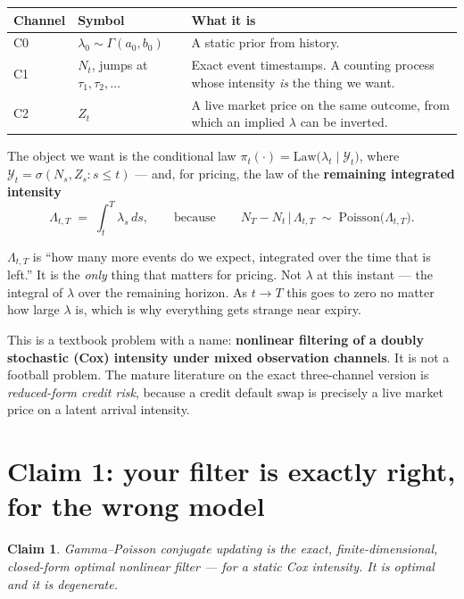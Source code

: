 \documentclass[11pt,a4paper]{article}
\theoremstyle{plain}
\newtheorem{claim}{Claim}
\begin{document}
\begin{center}
\begin{tabular}{@{}llp{7.4cm}@{}}
\toprule
\textbf{Channel} & \textbf{Symbol} & \textbf{What it is} \\
\midrule
C0 & $\lambda_0 \sim \Gamma(a_0,b_0)$ & A static prior from history. \\
C1 & $N_t$, jumps at $\tau_1,\tau_2,\dots$ & Exact event timestamps. A counting process whose intensity \emph{is} the thing we want. \\
C2 & $Z_t$ & A live market price on the same outcome, from which an implied $\lambda$ can be inverted. \\
\bottomrule
\end{tabular}
\end{center}

\noindent
The object we want is the conditional law $\pi_t(\cdot) = \mathrm{Law}\big(\lambda_t \mid \mathcal{Y}_t\big)$,
where $\mathcal{Y}_t = \sigma(N_s, Z_s : s\le t)$ --- and, for pricing, the law of the
\textbf{remaining integrated intensity}
\[
  \Lambda_{t,T} \;=\; \int_t^T \lambda_s\,ds,
  \qquad\text{because}\qquad
  N_T - N_t \,\big|\, \Lambda_{t,T} \;\sim\; \mathrm{Poisson}\big(\Lambda_{t,T}\big).
\]

\begin{plain}
$\Lambda_{t,T}$ is ``how many more events do we expect, integrated over the time that is
left.'' It is the \emph{only} thing that matters for pricing. Not $\lambda$ at this instant ---
the integral of $\lambda$ over the remaining horizon. As $t\to T$ this goes to zero no matter
how large $\lambda$ is, which is why everything gets strange near expiry.
\end{plain}

\noindent
This is a textbook problem with a name: \textbf{nonlinear filtering of a doubly stochastic
(Cox) intensity under mixed observation channels}. It is not a football problem. The mature
literature on the exact three-channel version is \emph{reduced-form credit risk}, because a
credit default swap is precisely a live market price on a latent arrival intensity.

\section{Claim 1: your filter is exactly right, for the wrong model}

\begin{claim}
Gamma--Poisson conjugate updating is the exact, finite-dimensional, closed-form optimal
nonlinear filter --- for a \emph{static} Cox intensity. It is optimal and it is degenerate.
\end{claim}
\end{document}
